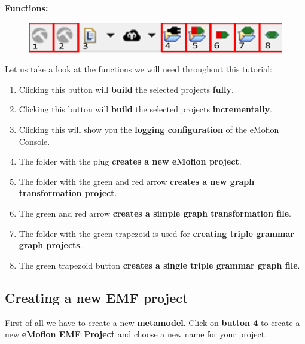 \clearpage

\textbf{Functions:\newline}

\begin{figure}[h]
    \centering
    \includegraphics[scale=0.25]{pictures/toolbar_eMoflon.png}
    \caption{}
    \label{toolbar}
\end{figure}

Let us take a look at the functions we will need throughout this tutorial:

\begin{enumerate}
\item Clicking this button will \textbf{build} the selected projects \textbf{fully}.
\label{item:0}

\item Clicking this button will \textbf{build} the selected projects \textbf{incrementally}.

\item Clicking this will show you the \textbf{logging configuration} of the eMoflon Console.

\item
\label{item:1}
The folder with the plug \textbf{creates a new eMoflon project}.

\item
\label{item:2}The folder with the green and red arrow \textbf{creates a new graph transformation project}.
\item The green and red arrow \textbf{creates a simple graph transformation file}.
\item 
\label{item:3}The folder with the green trapezoid is used for \textbf{creating triple grammar graph projects}.
\item \label{tgg_rule} The green trapezoid button \textbf{creates a single triple grammar graph file}. 
\end{enumerate}

\clearpage

\subsection{Creating a new EMF project}

First of all we have to create a new \textbf{metamodel}. Click on \textbf{button 4} to create a new \textbf{\textsf{eMoflon EMF Project}} and choose a new name for your project.

